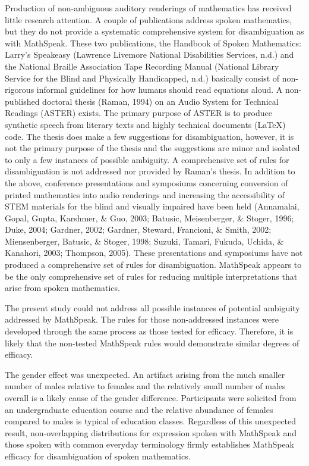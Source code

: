 \documentclass[11.5pt]{sig-alternate} %
\begin{document}
\begin{large}
Production of non-ambiguous auditory renderings of mathematics has received little research attention. A couple of publications address spoken mathematics, but they do not provide a systematic comprehensive system for disambiguation as with MathSpeak. These two publications, the Handbook of Spoken Mathematics: Larry’s Speakeasy (Lawrence Livemore National Disabilities Services, n.d.) and the National Braille Association Tape Recording Manual (National Library Service for the Blind and Physically Handicapped, n.d.) basically consist of non-rigorous informal guidelines for how humans should read equations aloud. A non-published doctoral thesis (Raman, 1994) on an Audio System for Technical Readings (ASTER) exists. The primary purpose of ASTER is to produce synthetic speech from literary texts and highly technical documents (LaTeX) code. The thesis does make a few suggestions for disambiguation, however, it is not the primary purpose of the thesis and the suggestions are minor and isolated to only a few instances of possible ambiguity. A comprehensive set of rules for disambiguation is not addressed nor provided by Raman’s thesis. In addition to the above, conference presentations and symposiums concerning conversion of printed mathematics into audio renderings and increasing the accessibility of STEM materials for the blind and visually impaired have been held (Annamalai, Gopal, Gupta, Karshmer, \& Guo, 2003; Batusic, Meisenberger, \& Stoger, 1996; Duke, 2004; Gardner, 2002; Gardner, Steward, Francioni, \& Smith, 2002; Miensenberger, Batusic, \& Stoger, 1998; Suzuki, Tamari, Fukuda, Uchida, \& Kanahori, 2003; Thompson, 2005). These presentations and symposiums have not produced a comprehensive set of rules for disambiguation. MathSpeak appears to be the only comprehensive set of rules for reducing multiple interpretations that arise from spoken mathematics.

The present study could not address all possible instances of potential ambiguity addressed by MathSpeak. The rules for those non-addressed instances were developed through the same process as those tested for efficacy. Therefore, it is likely that the non-tested MathSpeak rules would demonstrate similar degrees of efficacy.

The gender effect was unexpected. An artifact arising from the much smaller number of males relative to females and the relatively small number of males overall is a likely cause of the gender difference. Participants were solicited from an undergraduate education course and the relative abundance of females compared to males is typical of education classes. Regardless of this unexpected result, non-overlapping distributions for expression spoken with MathSpeak and those spoken with common everyday terminology firmly establishes MathSpeak efficacy for disambiguation of spoken mathematics.


\end{large}
\end{document}
